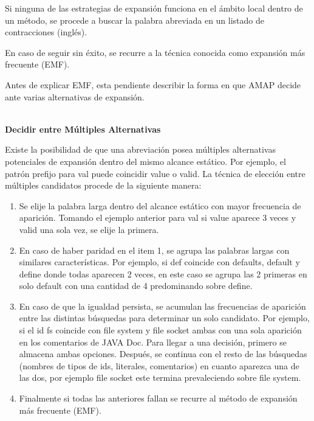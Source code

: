 \documentclass[a4paper,12pt]{report}
\begin{document}
Si ninguna de las estrategias de expansión funciona en el ámbito local dentro de un método, se procede a buscar la palabra abreviada en un listado de contracciones (inglés).

En caso de seguir sin éxito, se recurre a la técnica conocida como expansión más frecuente (EMF). 

Antes de explicar EMF, esta pendiente describir la forma en que AMAP decide ante varias alternativas de expansión.

\noindent \textbf{\\Decidir entre Múltiples Alternativas\\}

Existe la posibilidad de que una abreviación posea múltiples alternativas potenciales de expansión dentro del mismo alcance estático. Por ejemplo, el patrón prefijo para \textsf{val} puede coincidir \textsf{value} o \textsf{valid}. La técnica de elección entre múltiples candidatos procede de la siguiente manera:

\begin{enumerate}
\itemsep0em%
\item Se elije la palabra larga dentro del alcance estático con mayor frecuencia de aparición. Tomando el ejemplo anterior para \textsf{val} si \textsf{value} aparece 3 veces y \textsf{valid} una sola vez, se elije la primera.

\item En caso de haber paridad en el item 1, se agrupa las palabras largas con similares características. Por ejemplo, si \textsf{def} coincide con \textsf{defaults}, \textsf{default} y \textsf{define} donde todas aparecen 2 veces, en este caso se agrupa las 2 primeras en solo \textsf{default} con una cantidad de 4 predominando sobre \textsf{define}.

\item En caso de que la igualdad persista, se acumulan las frecuencias de aparición entre las distintas búsquedas para determinar un solo candidato. Por ejemplo, si el id \textsf{fs} coincide con \textsf{file system} y \textsf{file socket} ambas con una sola aparición en los comentarios de JAVA Doc. Para llegar a una decisión, primero se almacena ambas opciones. Después, se continua con el resto de las búsquedas (nombres de tipos de ids, literales, comentarios) en cuanto aparezca una de las dos, por ejemplo \textsf{file socket} este termina prevaleciendo sobre \textsf{file system}.

\item Finalmente si todas las anteriores fallan se recurre al método de expansión más frecuente (EMF). 

\end{enumerate}
\end{document}
